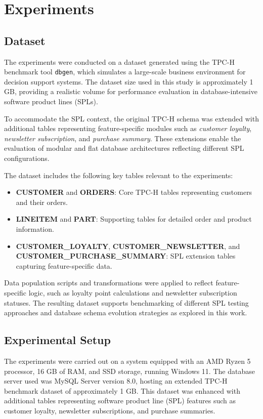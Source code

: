 \chapter{Experiments}
\label{chap:ch4}

\section{Dataset}
\label{sec:ch4sec1}

The experiments were conducted on a dataset generated using the TPC-H benchmark tool \texttt{dbgen}, which simulates a large-scale business environment for decision support systems. The dataset size used in this study is approximately 1 GB, providing a realistic volume for performance evaluation in database-intensive software product lines (SPLs).

To accommodate the SPL context, the original TPC-H schema was extended with additional tables representing feature-specific modules such as \textit{customer loyalty}, \textit{newsletter subscription}, and \textit{purchase summary}. These extensions enable the evaluation of modular and flat database architectures reflecting different SPL configurations.

The dataset includes the following key tables relevant to the experiments:
\begin{itemize}
    \item \textbf{CUSTOMER} and \textbf{ORDERS}: Core TPC-H tables representing customers and their orders.
    \item \textbf{LINEITEM} and \textbf{PART}: Supporting tables for detailed order and product information.
    \item \textbf{CUSTOMER\_LOYALTY}, \textbf{CUSTOMER\_NEWSLETTER}, and \textbf{CUSTOMER\_PURCHASE\_SUMMARY}: SPL extension tables capturing feature-specific data.
\end{itemize}

Data population scripts and transformations were applied to reflect feature-specific logic, such as loyalty point calculations and newsletter subscription statuses. The resulting dataset supports benchmarking of different SPL testing approaches and database schema evolution strategies as explored in this work.


\section{Experimental Setup}
\label{sec:ch4sec2}

The experiments were carried out on a system equipped with an AMD Ryzen 5  processor, 16 GB of RAM, and SSD storage, running Windows 11. The database server used was MySQL Server version 8.0, hosting an extended TPC-H benchmark dataset of approximately 1 GB. This dataset was enhanced with additional tables representing software product line (SPL) features such as customer loyalty, newsletter subscriptions, and purchase summaries.

